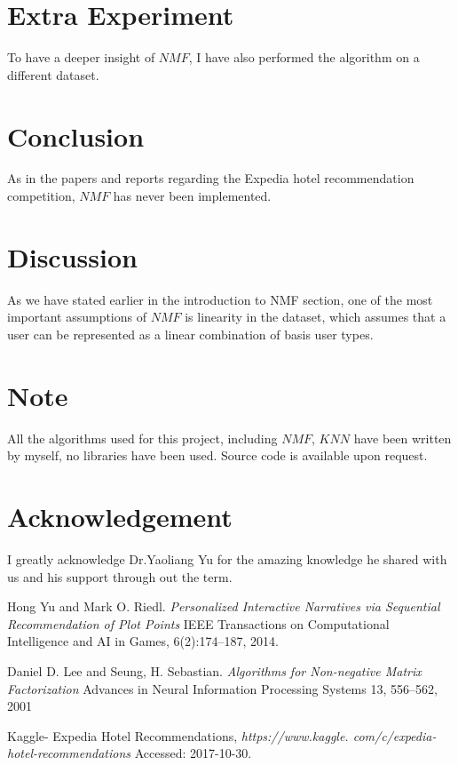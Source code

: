 \documentclass[11pt]{article} %
\begin{document}
\section{Extra Experiment}
To have a deeper insight of $NMF$, I have also performed the algorithm on a different dataset.

\section{Conclusion}
As in the papers and reports regarding the Expedia hotel recommendation competition, $NMF$ has never been implemented.

\section{Discussion}
As we have stated earlier in the introduction to NMF section, one of the most important assumptions of $NMF$ is linearity in the dataset, which assumes that a user can be represented as a linear combination of basis user types.
\section{Note}
All the algorithms used for this project, including $NMF$, $KNN$ have been written by myself, no libraries have been used. Source code is available upon request.
\section{Acknowledgement}
I greatly acknowledge Dr.Yaoliang Yu for the amazing knowledge he shared with us and his support through out the term.


\begin{thebibliography}{9}
Hong Yu and Mark O. Riedl.
\textit{Personalized Interactive Narratives via Sequential
Recommendation of Plot Points}
IEEE Transactions on Computational Intelligence and AI in Games, 6(2):174–187, 2014.

Daniel D. Lee and Seung, H. Sebastian.
\textit{Algorithms for Non-negative Matrix Factorization}
Advances in Neural Information Processing Systems 13, 556--562, 2001

Kaggle- Expedia Hotel Recommendations, 
\textit{https://www.kaggle.
com/c/expedia-hotel-recommendations}
Accessed: 2017-10-30.
\end{thebibliography}
\end{document}

